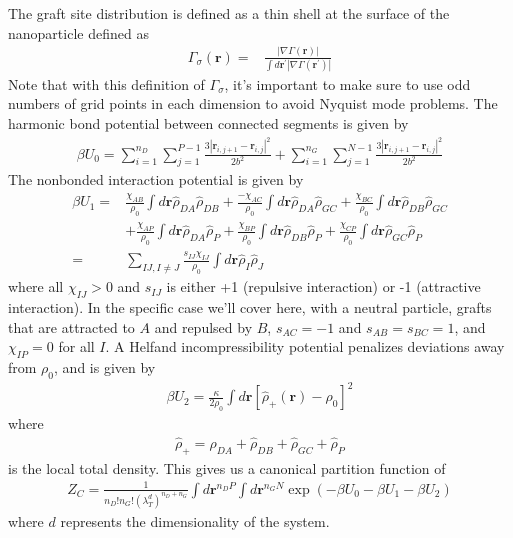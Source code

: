 \documentclass{article}
\begin{document}
The graft site distribution is defined as a thin shell at the surface of the
  nanoparticle defined as
\begin{align*}
  \Gamma_\sigma(\mathbf{r}) =&
    \frac{| \nabla \Gamma(\mathbf{r}) |}
         {\int d \mathbf{r^\prime} | \nabla \Gamma(\mathbf{r^\prime}) | }
\end{align*}
Note that with this definition of $\Gamma_\sigma$, it's important to make sure
  to use odd numbers of grid points in each dimension to avoid Nyquist mode
  problems.
The harmonic bond potential between connected segments is given by
\begin{align*}
  \beta U_0 =
    \sum_{i=1}^{n_D} \sum_{j=1}^{P-1}
    \frac{3 \left| \mathbf{r}_{i,j+1} - \mathbf{r}_{i,j} \right| ^ 2 }
         { 2 b^2 }
    +
    \sum_{i=1}^{n_G} \sum_{j=1}^{N-1}
    \frac{3 \left| \mathbf{r}_{i,j+1} - \mathbf{r}_{i,j} \right| ^ 2 }
         { 2 b^2 }
\end{align*}
The nonbonded interaction potential is given by
\begin{align*}
  \beta U_1 =&
    \frac{\chi_{AB}}{\rho_0} \int d\mathbf{r} \hat{\rho}_{DA} \hat{\rho}_{DB}
    + \frac{-\chi_{AC}}{\rho_0} \int d\mathbf{r} \hat{\rho}_{DA} \hat{\rho}_{GC}
    + \frac{\chi_{BC}}{\rho_0} \int d\mathbf{r} \hat{\rho}_{DB} \hat{\rho}_{GC}
    \\
    &+ \frac{\chi_{AP}}{\rho_0} \int d\mathbf{r} \hat{\rho}_{DA} \hat{\rho}_P
    + \frac{\chi_{BP}}{\rho_0} \int d\mathbf{r} \hat{\rho}_{DB} \hat{\rho}_P
    + \frac{\chi_{CP}}{\rho_0} \int d\mathbf{r} \hat{\rho}_{GC} \hat{\rho}_P \\
  =&
    \sum_{IJ, I \ne J} \frac{s_{IJ}\chi_{IJ}}{\rho_0}
    \int d \mathbf{r} \hat{\rho}_I \hat{\rho}_J
\end{align*}
where all $\chi_{IJ} > 0$ and $s_{IJ}$ is either +1 (repulsive interaction) or
  -1 (attractive interaction).
In the specific case we'll cover here, with a neutral particle, grafts that
  are attracted to $A$ and repulsed by $B$, $s_{AC} = -1$ and
  $s_{AB} = s_{BC} = 1$, and $\chi_{IP} = 0$ for all $I$.
A Helfand incompressibility potential penalizes deviations away from $\rho_0$,
  and is given by
\begin{align*}
  \beta U_2 = \frac{\kappa}{2 \rho_0} \int d \mathbf{r}
    \left[ \hat{\rho}_+ (\mathbf{r}) - \rho_0 \right] ^ 2
\end{align*}
where
\begin{align*}
  \hat{\rho}_+ =
    \hat{\rho}_{DA} + \hat{\rho}_{DB} + \hat{\rho}_{GC} + \hat{\rho}_P
\end{align*}
  is the local total density.
This gives us a canonical partition function of
\begin{align*}
  Z_C = \frac{1}{n_D!n_G! \left( \lambda_T^d \right)^{n_D+n_G}}
    \int d \mathbf{r}^{n_DP} \int d \mathbf{r}^{n_GN}
    \exp \left( -\beta U_0 - \beta U_1 - \beta U_2 \right)
\end{align*}
where $d$ represents the dimensionality of the system.
\end{document}
